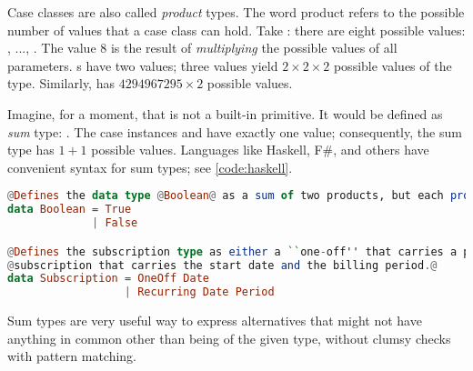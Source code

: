\documentclass[10 pt]{article}
\begin{document}
Case classes are also called \emph{product} types. The word product refers to the possible number of values that a case class can hold. Take : there are eight possible values: , ..., . The value $8$ is the result of \emph{multiplying} the possible values of all parameters. s have two values; three  values yield $2 \times 2 \times 2$ possible values of the  type. Similarly,  has $4294967295 \times 2$ possible values. 

Imagine, for a moment, that  is not a built-in primitive. It would be defined as \emph{sum} type: . The case instances  and  have exactly one value; consequently, the sum type  has $1 + 1$ possible values. Languages like Haskell\cite{haskell}, F\#\cite{fsharp}, and others have convenient syntax for sum types; see \autoref{code:haskell}.

\begin{lstlisting}[caption={Taxonomy as sum type}, label={code:haskell}, language=Haskell, escapechar=@]
@Defines the data type @Boolean@ as a sum of two products, but each product only has one value.@
data Boolean = True   
             | False

@Defines the subscription type as either a ``one-off'' that carries a particular end-date, or a recurring@
@subscription that carries the start date and the billing period.@
data Subscription = OneOff Date 
                  | Recurring Date Period
\end{lstlisting}

Sum types are very useful way to express alternatives that might not have anything in common other than being of the given type, without clumsy  checks with pattern matching.


\end{document}
